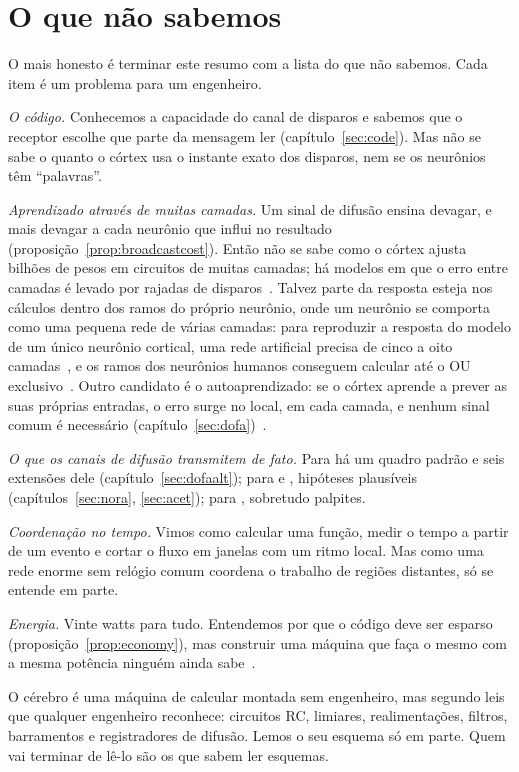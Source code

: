 \section{O que não sabemos}

O mais honesto é terminar este resumo com a lista do que não sabemos. Cada item é um problema para um engenheiro.

\emph{O código.} Conhecemos a capacidade do canal de disparos e sabemos que o receptor escolhe que parte da mensagem ler (capítulo~\ref{sec:code}). Mas não se sabe o quanto o córtex usa o instante exato dos disparos, nem se os neurônios têm ``palavras''.

\emph{Aprendizado através de muitas camadas.} Um sinal de difusão ensina devagar, e mais devagar a cada neurônio que influi no resultado (proposição~\ref{prop:broadcastcost}). Então não se sabe como o córtex ajusta bilhões de pesos em circuitos de muitas camadas; há modelos em que o erro entre camadas é levado por rajadas de disparos~\cite{Payeur2021}. Talvez parte da resposta esteja nos cálculos dentro dos ramos do próprio neurônio, onde um neurônio se comporta como uma pequena rede de várias camadas: para reproduzir a resposta do modelo de um único neurônio cortical, uma rede artificial precisa de cinco a oito camadas~\cite{Beniaguev2021}, e os ramos dos neurônios humanos conseguem calcular até o OU exclusivo~\cite{Gidon2020}. Outro candidato é o autoaprendizado: se o córtex aprende a prever as suas próprias entradas, o erro surge no local, em cada camada, e nenhum sinal comum é necessário (capítulo~\ref{sec:dofa})~\cite{Keller2018}.

\emph{O que os canais de difusão transmitem de fato.} Para  há um quadro padrão e seis extensões dele (capítulo~\ref{sec:dofaalt}); para  e , hipóteses plausíveis (capítulos~\ref{sec:nora}, \ref{sec:acet}); para , sobretudo palpites.

\emph{Coordenação no tempo.} Vimos como calcular uma função, medir o tempo a partir de um evento e cortar o fluxo em janelas com um ritmo local. Mas como uma rede enorme sem relógio comum coordena o trabalho de regiões distantes, só se entende em parte.

\emph{Energia.} Vinte watts para tudo. Entendemos por que o código deve ser esparso (proposição~\ref{prop:economy}), mas construir uma máquina que faça o mesmo com a mesma potência ninguém ainda sabe~\cite{MehonicKenyon2022}.

O cérebro é uma máquina de calcular montada sem engenheiro, mas segundo leis que qualquer engenheiro reconhece: circuitos RC, limiares, realimentações, filtros, barramentos e registradores de difusão. Lemos o seu esquema só em parte. Quem vai terminar de lê-lo são os que sabem ler esquemas.

